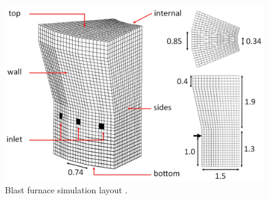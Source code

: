 \begin{figure}[!htb]
\centering
\includegraphics[width=.90\columnwidth]{images/273layoutbf}
\caption[Blast furnace simulation layout]{Blast furnace simulation layout \cite{RefWorks:208}.}
\label{fig:273layoutbf}
\end{figure}